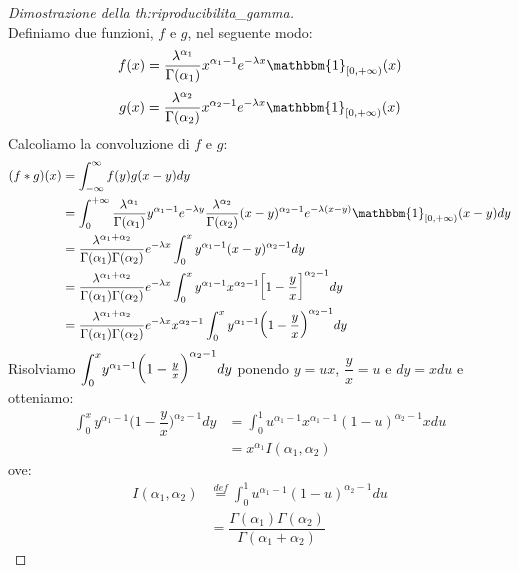 \documentclass[12pt]{report}
\newcommand{\namerefl}[1]{%
	\bgroup
	\let\nmu\MakeLowercase
	\nameref{#1}\egroup}
\newcommand{\nmu}{}
\begin{document}
	\begin{proof}[Dimostrazione della \namerefl{th:riproducibilita_gamma}] \quad \\
		Definiamo due funzioni, $f$ e $g$, nel seguente modo:
		\[
		f(x) = \dfrac{\lambda^{\alpha_1}}{\Gamma(\alpha_1)}x^{\alpha_1 - 1}e^{-\lambda x} \mathbbm{1}_{[0, +\infty)}(x)
		\]
		\[
		g(x) = \dfrac{\lambda^{\alpha_2}}{\Gamma(\alpha_2)}x^{\alpha_2 - 1}e^{-\lambda x}\mathbbm{1}_{[0, +\infty)}(x)
		\]
		Calcoliamo la convoluzione di $f$ e $g$:
		\begin{align*}
			(f * g)(x) &= \int_{-\infty}^{\infty}f(y)g(x-y)dy \\
			&= \int_{0}^{+\infty}\dfrac{\lambda^{\alpha_1}}{\Gamma(\alpha_1)}y^{\alpha_1 - 1}e^{-\lambda y}\dfrac{\lambda^{\alpha_2}}{\Gamma(\alpha_2)}(x-y)^{\alpha_2 - 1}e^{-\lambda(x-y)}\mathbbm{1}_{[0, +\infty)}(x-y)dy \\
			&= \dfrac{\lambda^{\alpha_1 + \alpha_2}}{\Gamma(\alpha_1)\Gamma(\alpha_2)}e^{-\lambda x}\int_{0}^{x}y^{\alpha_1 - 1}(x-y)^{\alpha_2 - 1}dy\\
			&= \dfrac{\lambda^{\alpha_1 + \alpha_2}}{\Gamma(\alpha_1)\Gamma(\alpha_2)}e^{-\lambda x}\int_{0}^{x}y^{\alpha_1 - 1}x^{\alpha_2 - 1}\bigg[1 - \frac{y}{x}\bigg]^{\alpha_2 - 1}dy \\
			&= \dfrac{\lambda^{\alpha_1 + \alpha_2}}{\Gamma(\alpha_1)\Gamma(\alpha_2)}e^{-\lambda x}x^{\alpha_2 - 1}\int_{0}^{x}y^{\alpha_1 - 1}\bigg(1 - \dfrac{y}{x}\bigg)^{\alpha_2 - 1}dy
		\end{align*}
		Risolviamo $\mathlarger{\int_{0}^{x}}y^{\alpha_1 - 1}\bigg(1 - \frac{y}{x}\bigg)^{\alpha_2 - 1}dy$ ponendo $y = ux$, $\dfrac{y}{x} = u$ e $dy = xdu$ e otteniamo:
		\begin{align*}
		\int_{0}^{x}y^{\alpha_1 - 1}\Bigg(1 - \dfrac{y}{x}\Bigg)^{\alpha_2 - 1}dy &= \int_{0}^{1}u^{\alpha_1 - 1}x^{\alpha_1 - 1}(1-u)^{\alpha_2 - 1}xdu \\
		&= x^{\alpha_1}I(\alpha_1, \alpha_2)
		\end{align*}
		ove:
		\begin{align*}
		I(\alpha_1, \alpha_2) &\overset{def}{=} \int_{0}^{1}u^{\alpha_1 - 1}(1-u)^{\alpha_2 - 1}du \\
		&= \dfrac{\Gamma(\alpha_1)\Gamma(\alpha_2)}{\Gamma(\alpha_1+ \alpha_2)}
		\end{align*}


\end{proof}
\end{document}
